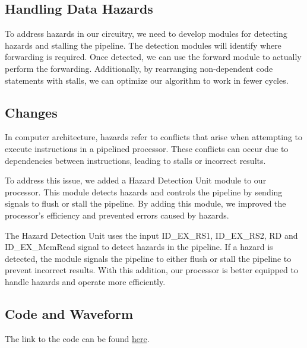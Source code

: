 \documentclass{report}
\begin{document}
\subsection{Handling Data Hazards}

To address hazards in our circuitry, we need to develop modules for detecting hazards and stalling the pipeline. The detection modules will identify where forwarding is required. Once detected, we can use the forward module to actually perform the forwarding. Additionally, by rearranging non-dependent code statements with stalls, we can optimize our algorithm to work in fewer cycles.

\subsection{Changes}

In computer architecture, hazards refer to conflicts that arise when attempting to execute instructions in a pipelined processor. These conflicts can occur due to dependencies between instructions, leading to stalls or incorrect results.

To address this issue, we added a Hazard Detection Unit module to our processor. This module detects hazards and controls the pipeline by sending signals to flush or stall the pipeline. By adding this module, we improved the processor's efficiency and prevented errors caused by hazards.


The Hazard Detection Unit uses the input ID\_EX\_RS1, ID\_EX\_RS2, RD and ID\_EX\_MemRead signal to detect hazards in the pipeline. If a hazard is detected, the module signals the pipeline to either flush or stall the pipeline to prevent incorrect results. With this addition, our processor is better equipped to handle hazards and operate more efficiently.



\subsection{Code and Waveform}
The link to the code can be found \href{https://github.com/NehalNN10/CA-final-project/blob/5b606f284db6f33765f0c830730e5cee43c01f18/final_project/final_project.srcs/sources_1/new/hazardProcessor.v}{here}.
\end{document}
